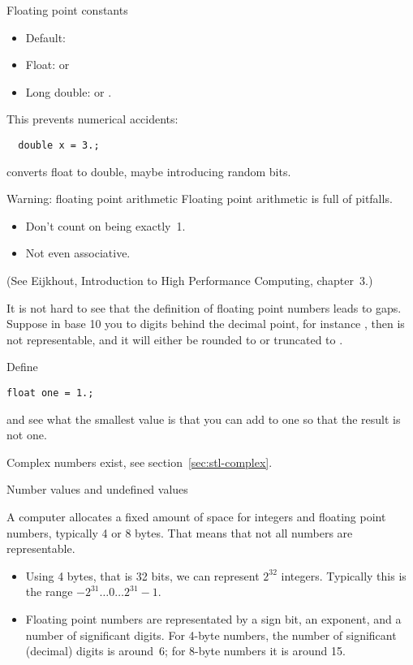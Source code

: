 \begin{block}{Floating point constants}
  \label{sl:float-vars}
  \begin{itemize}
  \item Default: 
  \item Float:  or 
  \item Long double:  or .
  \end{itemize}
  This prevents numerical accidents: 
\begin{verbatim}
  double x = 3.;
\end{verbatim}
  converts float to double, maybe introducing random bits.
\end{block}

\begin{block}{Warning: floating point arithmetic}
  \label{sl:float-arith}
  Floating point arithmetic is full of pitfalls.
  \begin{itemize}
  \item Don't count on  being exactly~1.
  \item Not even associative.
  \end{itemize}
  (See Eijkhout, Introduction to High Performance Computing, chapter~3.)
\end{block}

\begin{exercise}
  \label{ex:macheps}
  It is not hard to see that the definition of floating point numbers
  leads to gaps. Suppose in base 10 you to digits behind the decimal
  point, for instance , then  is not representable,
  and it will either be rounded to  or truncated to .

  Define 
\begin{verbatim}
float one = 1.;
\end{verbatim}
  and see what the smallest value  is that you can add to
  one so that the result is not one.
\end{exercise}

Complex numbers exist, see section~\ref{sec:stl-complex}.

 {Number values and undefined values}
\label{sec:naninf}

A computer allocates a fixed amount of space for integers and floating
point numbers, typically 4 or 8 bytes. That means that not all numbers
are representable.
\begin{itemize}
\item Using 4 bytes, that is 32 bits, we can represent $2^{32}$
  integers. Typically this is the range $-2^{31}\ldots 0 \ldots
  2^{31}-1$.
\item Floating point numbers are representated by a sign bit, an
  exponent, and a number of significant digits.
  For 4-byte numbers, the number of significant (decimal) digits is
  around~6; for 8-byte numbers it is around 15.
\end{itemize}

